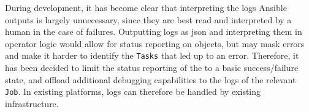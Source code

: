 During development, it has become clear that interpreting the logs Ansible outputs is largely unnecessary, since they are best read and interpreted by a human in the case of failures.
Outputting logs as \gls{json} and interpreting them in operator logic would allow for status reporting on objects, but may mask errors and make it harder to identify the \texttt{Tasks} that led up to an error.
Therefore, it has been decided to limit the status reporting of the \anrecjob to a basic success/failure state, and offload additional debugging capabilities to the logs of the relevant \texttt{Job}.
In existing platforms, logs can therefore be handled by existing infrastructure.

